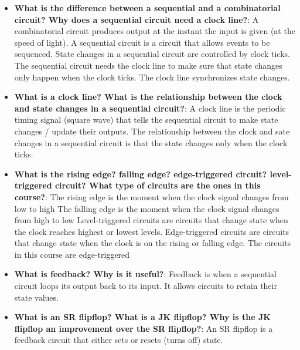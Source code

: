 \documentclass{report}
\begin{document}
    \pagebreak 
    \begin{itemize}
        \item \textbf{What is the difference between a sequential and a combinatorial circuit? Why does a sequential circuit need a clock line?}:
            A combinatorial circuit produces output at the instant the input is given (at the speed of light). A sequential circuit is a circuit that allows events to be sequenced. State changes in a sequential circuit are controlled by clock ticks.
            \bigbreak \noindent 
            The sequential circuit needs the clock line to make sure that state changes only happen when the clock ticks.
            \bigbreak \noindent 
            The clock line synchronizes state changes.
        \item \textbf{What is a clock line? What is the relationship between the clock and state changes in a sequential circuit?}:
            A clock line is the periodic timing signal (square wave) that tells the sequential circuit  to make state changes / update their outputs.
            \bigbreak \noindent 
            The relationship between the clock and sate changes in a sequential circuit is that the state changes only when the clock ticks.
        \item \textbf{What is the rising edge? falling edge? edge-triggered circuit? level-triggered circuit? What type of circuits are the ones in this course?}:
            The rising edge is the moment when the clock signal changes from low to high
            \bigbreak \noindent 
            The falling edge is the moment when the clock signal changes from high to low
            \bigbreak \noindent 
            Level-triggered circuits are circuits that change state when the clock reaches highest or lowest levels.
            \bigbreak \noindent 
            Edge-triggered circuits are circuits that change state when the clock is on the rising or falling edge.
            \bigbreak \noindent 
            The circuits in this course are edge-triggered
        \item \textbf{What is feedback? Why is it useful?}:
            Feedback is when a sequential circuit loops its output back to its input. It allows circuits to retain their state values.
        \item \textbf{What is an SR flipflop? What is a JK flipflop? Why is the JK flipflop an improvement over the SR flipflop?}:
            An SR flipflop is a feedback circuit that either sets or resets (turns off) state.
            \bigbreak \noindent 

\end{itemize}
\end{document}
